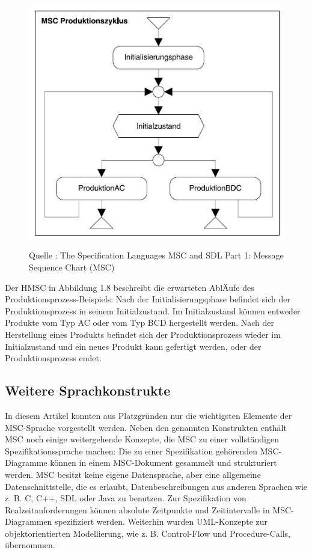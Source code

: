 \begin{center}
\begin{figure}[h]
   

\includegraphics[scale=1]{Graphics/HMSC.jpg}



Quelle : The Specification Languages MSC and SDL
Part 1: Message Sequence Chart (MSC) 

 
\label{fig9}


\end{figure}

\end{center}
\newpage
Der HMSC in Abbildung 1.8 beschreibt die erwarteten AblÄufe
des Produktionsprozess-Beispiels: Nach der Initialisierungsphase
befindet sich der Produktionsprozess in seinem
Initialzustand. Im Initialzustand können entweder Produkte
vom Typ AC oder vom Typ BCD hergestellt werden. Nach
der Herstellung eines Produkts befindet sich der Produktionsprozess
wieder im Initialzustand und ein neues Produkt
kann gefertigt werden, oder der Produktionsprozess endet.

\subsection{Weitere Sprachkonstrukte}
In diesem Artikel konnten aus Platzgründen nur die
wichtigsten Elemente der MSC-Sprache vorgestellt werden.
Neben den genannten Konstrukten enthält MSC
noch einige weitergehende Konzepte, die MSC zu einer
vollständigen Spezifikationssprache machen: Die zu einer
Spezifikation gehörenden MSC-Diagramme können in
einem MSC-Dokument gesammelt und strukturiert werden.
MSC besitzt keine eigene Datensprache, aber eine
allgemeine Datenschnittstelle, die es erlaubt, Datenbeschreibungen
aus anderen Sprachen wie z. B. C, C++, SDL
oder Java zu benutzen. Zur Spezifikation von Realzeitanforderungen
können absolute Zeitpunkte und Zeitintervalle
in MSC-Diagrammen spezifiziert werden. Weiterhin wurden
UML-Konzepte zur objektorientierten Modellierung,
wie z. B. Control-Flow und Procedure-Calls, übernommen.

